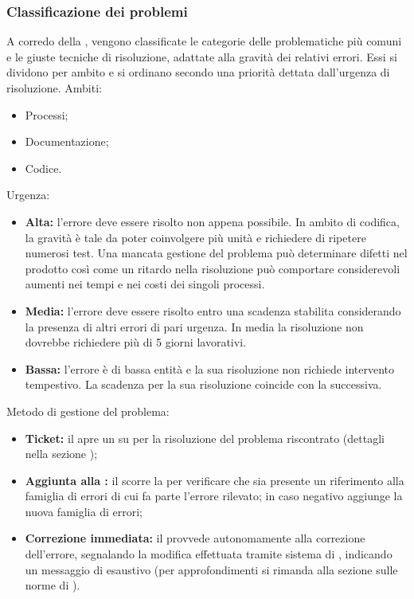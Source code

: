\documentclass[12pt,a4paper]{article}
\begin{document}
\subsubsection{Classificazione dei problemi}
A corredo della   \TODO{}, vengono classificate le categorie delle problematiche più comuni e le giuste tecniche di risoluzione, adattate alla gravità dei relativi errori. Essi si dividono per ambito e si ordinano secondo una priorità dettata dall'urgenza di risoluzione. Ambiti:
\begin{itemize}
  \item Processi;
  \item Documentazione;
  \item Codice.
\end{itemize}
Urgenza:
\begin{itemize}
  \item \textbf{Alta:} l'errore deve essere risolto non appena possibile. In ambito di codifica, la gravità è tale da poter coinvolgere più unità e richiedere di ripetere numerosi test. Una mancata gestione del problema può determinare difetti nel prodotto così come un ritardo nella risoluzione può comportare considerevoli aumenti nei tempi e nei costi dei singoli processi.
  \item \textbf{Media:} l'errore deve essere risolto entro una scadenza stabilita considerando la presenza di altri errori di pari urgenza. In media la risoluzione non dovrebbe richiedere più di 5 giorni lavorativi.
  \item \textbf{Bassa:} l'errore è di bassa entità e la sua risoluzione non richiede intervento tempestivo. La scadenza per la sua risoluzione coincide con la  successiva.
\end{itemize}
Metodo di gestione del problema:
\begin{itemize}
  \item \textbf{Ticket:} il \VR apre un  su  per la risoluzione del problema riscontrato (dettagli nella sezione \TODO{});
  \item \textbf{Aggiunta alla :} il \VR{} scorre la  per verificare che sia presente un riferimento alla famiglia di errori di cui fa parte l'errore rilevato; in caso negativo aggiunge la nuova famiglia di errori;
  \item \textbf{Correzione immediata:} il \VR provvede autonomamente alla correzione dell'errore, segnalando la modifica effettuata tramite sistema di , indicando un messaggio di  esaustivo (per approfondimenti si rimanda alla sezione sulle norme di  \TODO{}).
\end{itemize}
\end{document}
